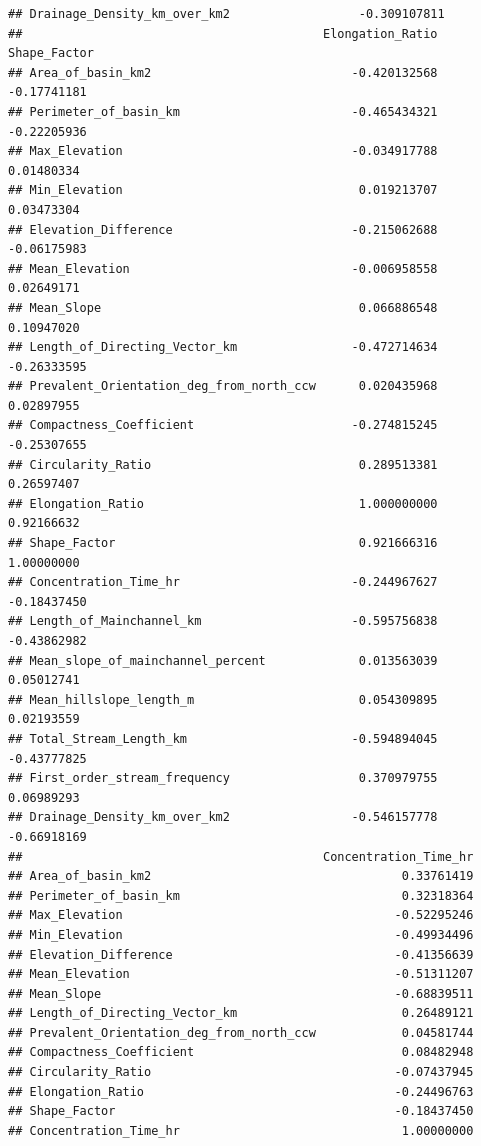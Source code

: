 \documentclass[11pt,]{article}
\begin{document}
\begin{verbatim}
## Drainage_Density_km_over_km2                  -0.309107811
##                                          Elongation_Ratio Shape_Factor
## Area_of_basin_km2                            -0.420132568  -0.17741181
## Perimeter_of_basin_km                        -0.465434321  -0.22205936
## Max_Elevation                                -0.034917788   0.01480334
## Min_Elevation                                 0.019213707   0.03473304
## Elevation_Difference                         -0.215062688  -0.06175983
## Mean_Elevation                               -0.006958558   0.02649171
## Mean_Slope                                    0.066886548   0.10947020
## Length_of_Directing_Vector_km                -0.472714634  -0.26333595
## Prevalent_Orientation_deg_from_north_ccw      0.020435968   0.02897955
## Compactness_Coefficient                      -0.274815245  -0.25307655
## Circularity_Ratio                             0.289513381   0.26597407
## Elongation_Ratio                              1.000000000   0.92166632
## Shape_Factor                                  0.921666316   1.00000000
## Concentration_Time_hr                        -0.244967627  -0.18437450
## Length_of_Mainchannel_km                     -0.595756838  -0.43862982
## Mean_slope_of_mainchannel_percent             0.013563039   0.05012741
## Mean_hillslope_length_m                       0.054309895   0.02193559
## Total_Stream_Length_km                       -0.594894045  -0.43777825
## First_order_stream_frequency                  0.370979755   0.06989293
## Drainage_Density_km_over_km2                 -0.546157778  -0.66918169
##                                          Concentration_Time_hr
## Area_of_basin_km2                                   0.33761419
## Perimeter_of_basin_km                               0.32318364
## Max_Elevation                                      -0.52295246
## Min_Elevation                                      -0.49934496
## Elevation_Difference                               -0.41356639
## Mean_Elevation                                     -0.51311207
## Mean_Slope                                         -0.68839511
## Length_of_Directing_Vector_km                       0.26489121
## Prevalent_Orientation_deg_from_north_ccw            0.04581744
## Compactness_Coefficient                             0.08482948
## Circularity_Ratio                                  -0.07437945
## Elongation_Ratio                                   -0.24496763
## Shape_Factor                                       -0.18437450
## Concentration_Time_hr                               1.00000000

\end{verbatim}
\end{document}
